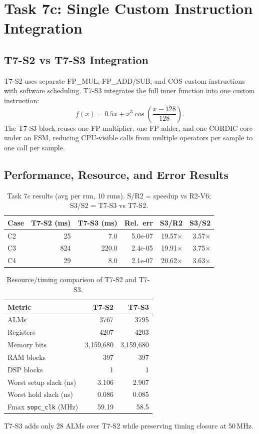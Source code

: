 \documentclass[a4paper,10pt,twocolumn]{article}
\begin{document}
\section{Task 7c: Single Custom Instruction Integration}

\subsection{T7-S2 vs T7-S3 Integration}
T7-S2 uses separate FP\_MUL, FP\_ADD/SUB, and COS custom instructions with software scheduling. T7-S3 integrates the full inner function into one custom instruction:
\[
f(x)=0.5x + x^3\cos\left(\frac{x-128}{128}\right).
\]
The T7-S3 block reuses one FP multiplier, one FP adder, and one CORDIC core under an FSM, reducing CPU-visible calls from multiple operators per sample to one call per sample.

\subsection{Performance, Resource, and Error Results}
\begin{table}[H]
\centering
\caption{Task 7c results (avg per run, 10 runs). S/R2 = speedup vs R2-V6; S3/S2 = T7-S3 vs T7-S2.}
\label{tab:t7c_summary}
\footnotesize
\setlength{\tabcolsep}{3pt}
\begin{tabular}{lrrrrr}
\toprule
Case & T7-S2 (ms) & T7-S3 (ms) & Rel.\ err & S3/R2 & S3/S2 \\
\midrule
C2 & 25 & 7.0 & 5.0e-07 & 19.57$\times$ & 3.57$\times$ \\
C3 & 824 & 220.0 & 2.4e-05 & 19.91$\times$ & 3.75$\times$ \\
C4 & 29 & 8.0 & 2.1e-07 & 20.62$\times$ & 3.63$\times$ \\
\bottomrule
\end{tabular}
\end{table}

\begin{table}[H]
\centering
\caption{Resource/timing comparison of T7-S2 and T7-S3.}
\label{tab:t7c_resource_compare}
\footnotesize
\setlength{\tabcolsep}{3pt}
\begin{tabular}{lrr}
\toprule
Metric & T7-S2 & T7-S3 \\
\midrule
ALMs & 3767 & 3795 \\
Registers & 4207 & 4203 \\
Memory bits & 3,159,680 & 3,159,680 \\
RAM blocks & 397 & 397 \\
DSP blocks & 1 & 1 \\
Worst setup slack (ns) & 3.106 & 2.907 \\
Worst hold slack (ns) & 0.086 & 0.085 \\
Fmax \texttt{sopc\_clk} (MHz) & 59.19 & 58.5 \\
\bottomrule
\end{tabular}
\end{table}
T7-S3 adds only 28 ALMs over T7-S2 while preserving timing closure at 50\,MHz.
\end{document}
